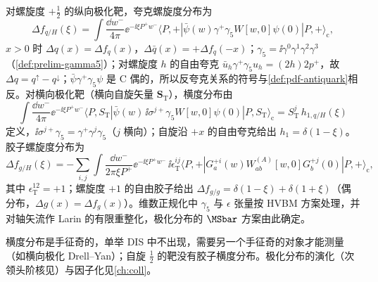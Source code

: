 \begin{definition}[螺旋度与横度分布]\label{def:pdf-polarized}
对螺旋度 $+\frac12$ 的纵向极化靶，夸克螺旋度分布为
\begin{equation}\label{eq:pdf-helicity}
\Delta f_{q/H}(\xi)=\int\frac{\dd w^-}{4\pi}\ee^{-\ii\xi P^+w^-}\langle P,+|\bar\psi(w)\gamma^+\gamma_5W[w,0]\psi(0)|P,+\rangle_{\mathrm c},
\end{equation}
$x>0$ 时 $\Delta q(x)=\Delta f_q(x)$，$\Delta\bar q(x)=+\Delta f_q(-x)$；$\gamma_5=\ii\gamma^0\gamma^1\gamma^2\gamma^3$（\cref{def:prelim-gamma5}）；对螺旋度 $h$ 的自由夸克 $\bar u_h\gamma^+\gamma_5u_h=(2h)2p^+$，故 $\Delta q=q^\uparrow-q^\downarrow$；$\bar\psi\gamma^+\gamma_5\psi$ 是 C 偶的，所以反夸克关系的符号与\cref{def:pdf-antiquark}相反。对横向极化靶（横向自旋矢量 $\bm S_{\mathrm T}$），横度分布由
\begin{equation}\label{eq:pdf-transversity}
\int\frac{\dd w^-}{4\pi}\ee^{-\ii\xi P^+w^-}\langle P,S_{\mathrm T}|\bar\psi(w)\,\ii\sigma^{j+}\gamma_5W[w,0]\psi(0)|P,S_{\mathrm T}\rangle_{\mathrm c}=S_{\mathrm T}^j\,h_{1,q/H}(\xi)
\end{equation}
定义，$\ii\sigma^{j+}\gamma_5=\gamma^+\gamma^j\gamma_5$（$j$ 横向）；自旋沿 $+x$ 的自由夸克给出 $h_1=\delta(1-\xi)$。胶子螺旋度分布为
\begin{equation}\label{eq:pdf-dg}
\Delta f_{g/H}(\xi)=-\sum_{i,j}\int\frac{\dd w^-}{2\pi\xi P^+}\ee^{-\ii\xi P^+w^-}\,\ii\epsilon_{\mathrm T}^{ij}\langle P,+|G^{+i}_a(w)W^{(A)}_{ab}[w,0]G^{+j}_b(0)|P,+\rangle_{\mathrm c},
\end{equation}
其中 $\epsilon_{\mathrm T}^{12}=+1$；螺旋度 $+1$ 的自由胶子给出 $\Delta f_{g/g}=\delta(1-\xi)+\delta(1+\xi)$（偶分布，$\Delta g(x)=\Delta f_g(x)$）。维数正规化中 $\gamma_5$ 与 $\epsilon$ 张量按 HVBM 方案处理，并对轴矢流作 Larin 的有限重整化\cite{Larin:1993tq}，极化分布的 $\MSbar$ 方案由此确定。
\end{definition}

横度分布是手征奇的，单举 DIS 中不出现，需要另一个手征奇的对象才能测量（如横向极化 Drell--Yan\cite{RalstonSoper1979,JaffeJi1991,JaffeJi1992}）；自旋 $\frac12$ 的靶没有胶子横度分布。极化分布的演化（次领头阶核见\cite{MertigVanNeerven1996,Vogelsang1996}）与因子化见\cref{ch:coll}。

